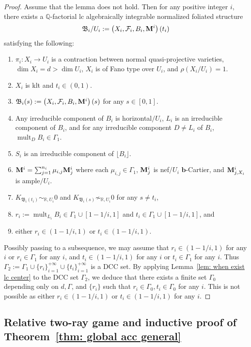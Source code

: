 \documentclass[11pt,reqno]{amsart}
\numberwithin{equation}{section}
\newcommand{\bb}{\bm{b}}
\newcommand{\Mm}{{\bf{M}}}
\newcommand{\mult}{\operatorname{mult}}
\newcommand{\Bb}{{\mathfrak{B}}}
\newcommand{\Ff}{\mathcal{F}}
\newcommand{\Ii}{\Gamma}
\theoremstyle{definition}
\begin{document}
\begin{proof}
Assume that the lemma does not hold. Then for any positive integer $i$, there exists a $\mathbb Q$-factorial lc algebraically integrable normalized foliated structure 
$$\Bb_i/U_i:=\left(X_i,\Ff_i,B_i,\Mm^i\right)(t_i)$$
satisfying the following:
\begin{enumerate}
\item $\pi_i: X_i\rightarrow U_i$ is a contraction between normal quasi-projective varieties, $\dim X_i=d>\dim U_i$, $X_i$ is of Fano type over $U_i$, and $\rho(X_i/U_i)=1$. 
\item $X_i$ is klt and $t_i\in (0,1)$.
\item $\Bb_i(s):=\left(X_i,\Ff_i,B_i,\Mm^i\right)(s)$ for any $s\in [0,1]$.
\item Any irreducible component of $B_i$ is horizontal$/U_i$, $L_i$ is an irreducible component of $B_i$, and for any irreducible component $D\neq L_i$ of $B_i$, $\mult_DB_i\in\Ii_1$.   
\item $S_i$ is an irreducible component of $\lfloor B_i\rfloor$.
\item $\Mm^i=\sum_{j=1}^{n_i}\mu_{i,j}\Mm^i_j$ where each $\mu_{i,j}\in\Ii_1$, $\Mm^i_j$ is nef$/U_i$ $\bb$-Cartier, and $\Mm^i_{j,X_i}$ is ample$/U_i$.
\item $K_{\Bb_i(t_i)}\sim_{\mathbb R,U_i}0$ and $K_{\Bb_i(s)}\not\sim_{\mathbb R,U_i}0$ for any $s\neq t_i$,
\item $r_i:=\mult_{L_i}B_i\in\Ii_1\cup [1-1/i,1]$ and $t_i\in\Ii_1\cup [1-1/i,1]$, and
\item either $r_i\in (1-1/i,1)$ or $t_i\in (1-1/i,1)$.
\end{enumerate}
Possibly passing to a subsequence, we may assume that $r_i\in (1-1/i,1)$ for any $i$ or $r_i\in\Ii_1$ for any $i$, and $t_i\in (1-1/i,1)$ for any $i$ or $t_i\in\Ii_1$ for any $i$. Thus $\Ii_2:=\Ii_1\cup\{r_i\}_{i=1}^{+\infty}\cup\{t_i\}_{i=1}^{+\infty}$ is a DCC set. By applying Lemma~\ref{lem: when exist lc center} to the DCC set $\Ii_2$, we deduce that there exists a finite set $\Ii_0$ depending only on $d,\Ii$, and $\{r_i\}$ such that $r_i\in\Ii_0,t_i\in\Ii_0$ for any $i$. This is not possible as either $r_i\in (1-1/i,1)$ or $t_i\in (1-1/i,1)$ for any $i$.
\end{proof}


\subsection{Relative two-ray game and inductive proof of Theorem~\ref{thm: global acc general}}
\end{document}
